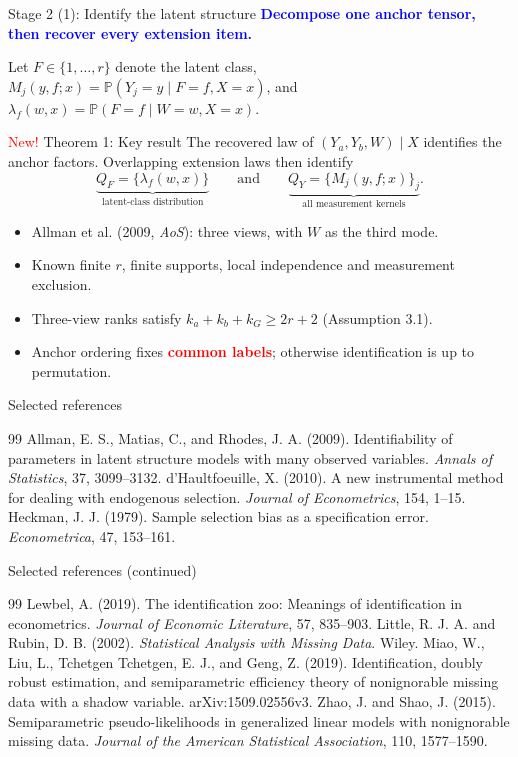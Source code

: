 \documentclass[aspectratio=169,10pt]{beamer}
\newcommand{\slidebody}{\fontsize{10.6pt}{12.6pt}\selectfont}
\renewcommand{\footnotesize}{\slidebody}
\newcommand{\Prb}{\mathbb P}
\newcommand{\bluekey}[1]{\textcolor{Blue}{\textbf{#1}}}
\newcommand{\redkey}[1]{\textcolor{Red}{\textbf{#1}}}
\begin{document}
\begin{frame}{Stage 2 (1): Identify the latent structure}
\bluekey{Decompose one anchor tensor, then recover every extension item.}\par
\smallskip
Let $F\in\{1,\ldots,r\}$ denote the latent class,
$M_j(y,f;x)=\Prb(Y_j=y\mid F=f,X=x)$, and
$\lambda_f(w,x)=\Prb(F=f\mid W=w,X=x)$.
\begin{block}{\textcolor{Red}{New!} Theorem 1: Key result}
The recovered law of $(Y_a,Y_b,W)\mid X$ identifies the anchor factors.
Overlapping extension laws then identify
\[
\underbrace{Q_F=\{\lambda_f(w,x)\}}_{\text{latent-class distribution}}
\qquad\text{and}\qquad
\underbrace{Q_Y=\{M_j(y,f;x)\}_j}_{\text{all measurement kernels}}.
\]
\end{block}
\begin{itemize}
\item Allman et al. (2009, \emph{AoS}): three views, with $W$ as the third mode.
\item Known finite $r$, finite supports, local independence and measurement exclusion.
\item Three-view ranks satisfy $k_a+k_b+k_G\ge 2r+2$ (Assumption 3.1).
\item Anchor ordering fixes \redkey{common labels}; otherwise identification is up to permutation.
\end{itemize}
\end{frame}

\begin{frame}{Selected references}
\footnotesize
\begin{thebibliography}{99}
\bibitem{} Allman, E. S., Matias, C., and Rhodes, J. A. (2009). Identifiability of parameters in latent structure models with many observed variables. \emph{Annals of Statistics}, 37, 3099--3132.
\bibitem{} d'Haultfoeuille, X. (2010). A new instrumental method for dealing with endogenous selection. \emph{Journal of Econometrics}, 154, 1--15.
\bibitem{} Heckman, J. J. (1979). Sample selection bias as a specification error. \emph{Econometrica}, 47, 153--161.
\end{thebibliography}
\end{frame}

\begin{frame}{Selected references (continued)}
\begin{thebibliography}{99}
\bibitem{} Lewbel, A. (2019). The identification zoo: Meanings of identification in econometrics. \emph{Journal of Economic Literature}, 57, 835--903.
\bibitem{} Little, R. J. A. and Rubin, D. B. (2002). \emph{Statistical Analysis with Missing Data}. Wiley.
\bibitem{} Miao, W., Liu, L., Tchetgen Tchetgen, E. J., and Geng, Z. (2019). Identification, doubly robust estimation, and semiparametric efficiency theory of nonignorable missing data with a shadow variable. arXiv:1509.02556v3.
\bibitem{} Zhao, J. and Shao, J. (2015). Semiparametric pseudo-likelihoods in generalized linear models with nonignorable missing data. \emph{Journal of the American Statistical Association}, 110, 1577--1590.
\end{thebibliography}
\end{frame}
\end{document}
